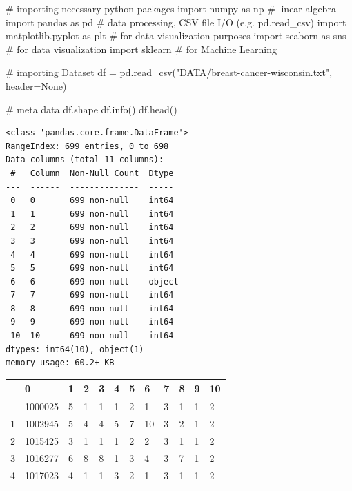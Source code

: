 \documentclass[
  letterpaper,
  DIV=11,
  numbers=noendperiod]{scrreprt}
\newenvironment{Shaded}{\begin{snugshade}}{\end{snugshade}}
\newcommand{\CommentTok}[1]{\textcolor[rgb]{0.37,0.37,0.37}{#1}}
\newcommand{\ImportTok}[1]{\textcolor[rgb]{0.00,0.46,0.62}{#1}}
\newcommand{\NormalTok}[1]{\textcolor[rgb]{0.00,0.23,0.31}{#1}}
\newcommand{\OperatorTok}[1]{\textcolor[rgb]{0.37,0.37,0.37}{#1}}
\newcommand{\StringTok}[1]{\textcolor[rgb]{0.13,0.47,0.30}{#1}}
\newcommand{\VariableTok}[1]{\textcolor[rgb]{0.07,0.07,0.07}{#1}}
\newcounter{none} %
\begin{document}
\begin{Shaded}
\begin{Highlighting}[]
\CommentTok{\# importing necessary python packages }
\ImportTok{import}\NormalTok{ numpy }\ImportTok{as}\NormalTok{ np }\CommentTok{\# linear algebra}
\ImportTok{import}\NormalTok{ pandas }\ImportTok{as}\NormalTok{ pd }\CommentTok{\# data processing, CSV file I/O (e.g. pd.read\_csv)}
\ImportTok{import}\NormalTok{ matplotlib.pyplot }\ImportTok{as}\NormalTok{ plt }\CommentTok{\# for data visualization purposes}
\ImportTok{import}\NormalTok{ seaborn }\ImportTok{as}\NormalTok{ sns }\CommentTok{\# for data visualization}
\ImportTok{import}\NormalTok{ sklearn }\CommentTok{\# for Machine Learning}
\end{Highlighting}
\end{Shaded}

\begin{Shaded}
\begin{Highlighting}[]
\CommentTok{\# importing Dataset }
\NormalTok{df }\OperatorTok{=}\NormalTok{ pd.read\_csv(}\StringTok{"DATA/breast{-}cancer{-}wisconsin.txt"}\NormalTok{, header}\OperatorTok{=}\VariableTok{None}\NormalTok{)}
\end{Highlighting}
\end{Shaded}

\begin{Shaded}
\begin{Highlighting}[]
\CommentTok{\# meta data }
\NormalTok{df.shape}
\NormalTok{df.info()}
\NormalTok{df.head()}
\end{Highlighting}
\end{Shaded}

\begin{verbatim}
<class 'pandas.core.frame.DataFrame'>
RangeIndex: 699 entries, 0 to 698
Data columns (total 11 columns):
 #   Column  Non-Null Count  Dtype 
---  ------  --------------  ----- 
 0   0       699 non-null    int64 
 1   1       699 non-null    int64 
 2   2       699 non-null    int64 
 3   3       699 non-null    int64 
 4   4       699 non-null    int64 
 5   5       699 non-null    int64 
 6   6       699 non-null    object
 7   7       699 non-null    int64 
 8   8       699 non-null    int64 
 9   9       699 non-null    int64 
 10  10      699 non-null    int64 
dtypes: int64(10), object(1)
memory usage: 60.2+ KB
\end{verbatim}

{\def\LTcaptype{none} %
\begin{longtable}[]{@{}llllllllllll@{}}
\toprule\noalign{}
& 0 & 1 & 2 & 3 & 4 & 5 & 6 & 7 & 8 & 9 & 10 \\
\midrule\noalign{}
\endhead
\bottomrule\noalign{}
\endlastfoot
0 & 1000025 & 5 & 1 & 1 & 1 & 2 & 1 & 3 & 1 & 1 & 2 \\
1 & 1002945 & 5 & 4 & 4 & 5 & 7 & 10 & 3 & 2 & 1 & 2 \\
2 & 1015425 & 3 & 1 & 1 & 1 & 2 & 2 & 3 & 1 & 1 & 2 \\
3 & 1016277 & 6 & 8 & 8 & 1 & 3 & 4 & 3 & 7 & 1 & 2 \\
4 & 1017023 & 4 & 1 & 1 & 3 & 2 & 1 & 3 & 1 & 1 & 2 \\
\end{longtable}
}
\end{document}

